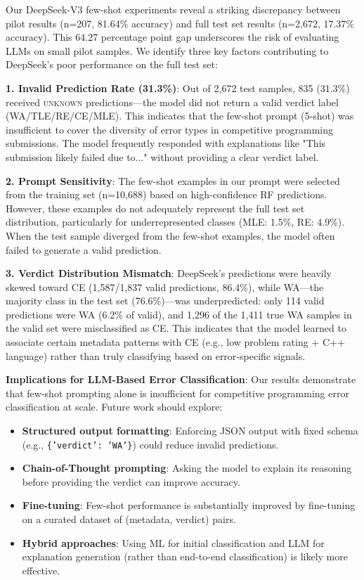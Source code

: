 \documentclass[10pt,a4paper]{article}
\begin{document}
Our DeepSeek-V3 few-shot experiments reveal a striking discrepancy between pilot results (n=207, 81.64\% accuracy) and full test set results (n=2,672, 17.37\% accuracy). This 64.27 percentage point gap underscores the risk of evaluating LLMs on small pilot samples. We identify three key factors contributing to DeepSeek's poor performance on the full test set:

\textbf{1. Invalid Prediction Rate (31.3\%)}: Out of 2,672 test samples, 835 (31.3\%) received \textsc{unknown} predictions---the model did not return a valid verdict label (WA/TLE/RE/CE/MLE). This indicates that the few-shot prompt (5-shot) was insufficient to cover the diversity of error types in competitive programming submissions. The model frequently responded with explanations like "This submission likely failed due to..." without providing a clear verdict label.

\textbf{2. Prompt Sensitivity}: The few-shot examples in our prompt were selected from the training set (n=10,688) based on high-confidence RF predictions. However, these examples do not adequately represent the full test set distribution, particularly for underrepresented classes (MLE: 1.5\%, RE: 4.9\%). When the test sample diverged from the few-shot examples, the model often failed to generate a valid prediction.

\textbf{3. Verdict Distribution Mismatch}: DeepSeek's predictions were heavily skewed toward CE (1,587/1,837 valid predictions, 86.4\%), while WA---the majority class in the test set (76.6\%)---was underpredicted: only 114 valid predictions were WA (6.2\% of valid), and 1,296 of the 1,411 true WA samples in the valid set were misclassified as CE. This indicates that the model learned to associate certain metadata patterns with CE (e.g., low problem rating + C++ language) rather than truly classifying based on error-specific signals.

\textbf{Implications for LLM-Based Error Classification}: Our results demonstrate that few-shot prompting alone is insufficient for competitive programming error classification at scale. Future work should explore:
\begin{itemize}
    \item \textbf{Structured output formatting}: Enforcing JSON output with fixed schema (e.g., \texttt{\{'verdict': 'WA'\}}) could reduce invalid predictions.
    \item \textbf{Chain-of-Thought prompting}: Asking the model to explain its reasoning before providing the verdict can improve accuracy.
    \item \textbf{Fine-tuning}: Few-shot performance is substantially improved by fine-tuning on a curated dataset of (metadata, verdict) pairs.
    \item \textbf{Hybrid approaches}: Using ML for initial classification and LLM for explanation generation (rather than end-to-end classification) is likely more effective.
\end{itemize}
\end{document}

